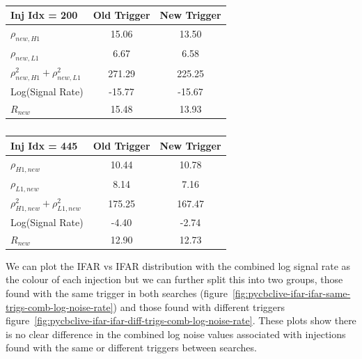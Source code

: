 %
\begin{table}[ht]
    \centering
    \setlength{\tabcolsep}{5pt}
    \begin{minipage}{0.48\textwidth}
        \centering
        \begin{adjustbox}{minipage=\linewidth-0cm, margin=-5cm 0pt 0pt 0cm}
        \begin{tabular}{lcc}
            \toprule
            \textbf{Inj Idx = 200} & \textbf{Old Trigger} & \textbf{New Trigger} \\
            \midrule
            $\rho_{new, H1}$  & 15.06 & 13.50 \\
            $\rho_{new, L1}$   & 6.67 & 6.58 \\
            $\rho_{new, H1}^2 + \rho_{new, L1}^2$   & 271.29 & 225.25 \\
            Log(Signal Rate) & -15.77 & -15.67 \\
            $R_{new}$ & 15.48 & 13.93 \\
            \bottomrule
        \end{tabular}
        \end{adjustbox}
        \caption{}
        \label{tab:pycbclive-200-old-stat}
    \end{minipage}%
    \hfill
    \begin{minipage}{0.48\textwidth}
        \centering
        \begin{tabular}{lcc}
            \toprule
            \textbf{Inj Idx = 445} & \textbf{Old Trigger} & \textbf{New Trigger} \\
            \midrule
            $\rho_{H1,new}$  & 10.44 & 10.78 \\
            $\rho_{L1,new}$   & 8.14 & 7.16 \\
            $\rho_{H1,new}^2 + \rho_{L1,new}^2$   & 175.25 & 167.47 \\
            Log(Signal Rate) & -4.40 & -2.74 \\
            $R_{new}$ & 12.90 & 12.73 \\
            \bottomrule
        \end{tabular}
        \caption{}
        \label{tab:pycbclive-445-old-stat}
    \end{minipage}
\end{table}
%
We can plot the IFAR vs IFAR distribution with the combined log signal rate as the colour of each injection but we can further split this into two groups, those found with the same trigger in both searches (figure~\ref{fig:pycbclive-ifar-ifar-same-trigs-comb-log-noise-rate}) and those found with different triggers figure~\ref{fig:pycbclive-ifar-ifar-diff-trigs-comb-log-noise-rate}. These plots show there is no clear difference in the combined log noise values associated with injections found with the same or different triggers between searches.
